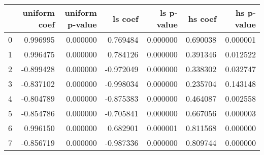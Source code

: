 \begin{tabular}{lrrrrrr}
\toprule
 & uniform coef & uniform p-value & ls coef & ls p-value & hs coef & hs p-value \\
\midrule
0 & 0.996995 & 0.000000 & 0.769484 & 0.000000 & 0.690038 & 0.000001 \\
1 & 0.996475 & 0.000000 & 0.784126 & 0.000000 & 0.391346 & 0.012522 \\
2 & -0.899428 & 0.000000 & -0.972049 & 0.000000 & 0.338302 & 0.032747 \\
3 & -0.837102 & 0.000000 & -0.998034 & 0.000000 & 0.235704 & 0.143148 \\
4 & -0.804789 & 0.000000 & -0.875383 & 0.000000 & 0.464087 & 0.002558 \\
5 & -0.854786 & 0.000000 & -0.705841 & 0.000000 & 0.667056 & 0.000003 \\
6 & 0.996150 & 0.000000 & 0.682901 & 0.000001 & 0.811568 & 0.000000 \\
7 & -0.856719 & 0.000000 & -0.987336 & 0.000000 & 0.809744 & 0.000000 \\
\bottomrule
\end{tabular}
